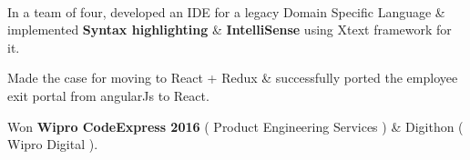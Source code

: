 \documentclass[]{hieudo-build}
\begin{document}
\begin{minipage}[t]{0.65\textwidth}
 \\
\begin{tightemize}
		\item In a team of four, developed an IDE for a legacy Domain Specific Language \& implemented \textbf{Syntax highlighting} \& \textbf{IntelliSense} using Xtext framework for it.
		\item Made the case for moving to React + Redux \& successfully ported the employee exit portal from angularJs to React.
        \item Won \textbf{Wipro CodeExpress 2016} ( Product Engineering Services ) \& Digithon ( Wipro Digital ).
\end{tightemize}
\sectionsep





\end{minipage}
\end{document}
